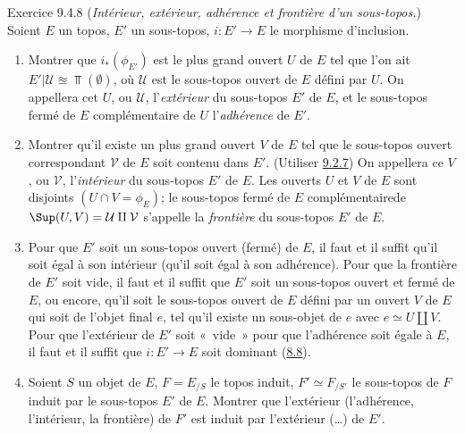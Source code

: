 \documentclass[10pt]{../fichiers-configuration-latex/smfart}
\begin{document}
\begin{enonce*}[remark]{Exercice 9.4.8}
(\emph{Intérieur, extérieur, adhérence et frontière d'un
sous-topos.}) Soient $E$ un topos, $E'$ un sous-topos,
$i:E'\rightarrow E$ le morphisme d'inclusion.
\begin{enumerate}
\renewcommand{\theenumi}{\alph{enumi}}
\renewcommand{\labelenumi}{\theenumi)}
\item Montrer que $i_{\ast}(\phi_{E'})$ est le plus grand ouvert $U$
de $E$ tel que l'on ait $E'| \mathcal{U} \approxeq \Top(∅)$, où
$\mathcal{U}$ est le sous-topos ouvert de $E$ défini par $U$. On
appellera cet $U$, ou $\mathcal{U}$, l'\emph{extérieur} du
sous-topos $E'$ de $E$, et le sous-topos fermé de $E$ complémentaire
de $U$ l'\emph{adhérence} de $E'$.

\item Montrer qu'il existe un plus grand ouvert $V$ de $E$ tel que le
sous-topos ouvert correspondant $\mathcal{V}$ de $E$ soit contenu
dans $E'$. (Utiliser \hyperref[IV.exer9.2.7]{9.2.7}) On appellera ce $V$, ou
$\mathcal{V}$, l'\emph{intérieur} du sous-topos $E'$ de $E$. Les
ouverts $U$ et $V$ de $E$ sont disjoints $(U\cap V=\phi_E)$; le
sous-topos fermé de $E$ complémentaire\pageoriginale de
$\Sup(U,V)=\mathcal{U}\amalg \mathcal{V}$ s'appelle la
\emph{frontière} du sous-topos $E'$ de $E$.

\item Pour que $E'$ soit un sous-topos ouvert (\resp fermé) de $E$, il
faut et il suffit qu'il soit égal à son intérieur (\resp qu'il soit
égal à son adhérence). Pour que la frontière de $E'$ soit vide, il
faut et il suffit que $E'$ soit un sous-topos ouvert et fermé de
$E$, ou encore, qu'il soit le sous-topos ouvert de $E$ défini par un
ouvert $V$ de $E$ qui soit \emph{} de l'objet final
$e$, \ie tel qu'il existe un sous-objet  de $e$ avec $e\simeq
U\amalg V$. Pour que l'extérieur de $E'$ soit « vide »  \ie pour
que l'adhérence soit égale à $E$, il faut et il suffit que
$i:E'\rightarrow E$ soit dominant (\hyperref[IV.exer8.8]{8.8}).

\item Soient $S$ un objet de $E$, $F=E_{/S}$ le topos induit, $F'\simeq
F_{/S'}$ le sous-topos de $F$ induit par le sous-topos $E'$ de $E$.
Montrer que l'extérieur (\resp l'adhérence, \resp
l'intérieur, \resp
la frontière) de $F'$ est induit par l'extérieur (\resp\ldots) de
$E'$.
\end{enumerate}
\end{enonce*}
\end{document}

